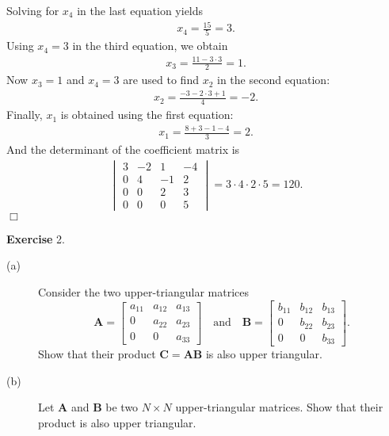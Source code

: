 \documentclass[UTF8,12pt,hyperref]{ctexart}
\makeatletter
\newenvironment{exercise}[1][{\color{blue}\bf Exercise}]%
{%
 \begin{center}   \begin{lrbox}{\@tempboxa}%
    \begin{minipage}{\textwidth}%
  {\color{blue}\bfseries
#1}   }{%
    \end{minipage}%
    \end{lrbox}
    \colorbox{green}{\noindent\usebox{\@tempboxa}} \end{center}  
}
\newenvironment{solve}[1][\color{blue}\bf Solve]{\begin{trivlist}
\item[\hskip \labelsep {\color{blue}\bfseries
#1}]}{\hfill$\Box$\end{trivlist}}
\makeatother
\begin{document}
\begin{solve}
    Solving for $x_4$ in the last equation yields
    \begin{align*}
      x_4=\frac{15}{5}=3.
    \end{align*}
    Using $x_4=3$ in the third equation, we obtain
    \begin{align*}
      x_3=\frac{11-3\cdot 3}{2} = 1.
    \end{align*}
    Now $x_3=1$ and $x_4=3$ are used to find $x_2$ in the second equation: 
    \begin{align*}
      x_2=\frac{-3-2\cdot 3+1}{4}=-2.
    \end{align*}
    Finally, $x_1$ is obtained using the first equation:
    \begin{align*}
      x_1=\frac{8+3-1-4}{3}=2.
    \end{align*}
    And the determinant of the coefficient matrix is
    \begin{align*}
      \begin{vmatrix}
        3& -2 & 1 &-4 \\
        0&  4&  -1& 2\\
        0&  0&  2& 3\\
        0&  0&  0& 5
      \end{vmatrix} = 3\cdot 4\cdot 2\cdot 5 = 120.
    \end{align*}
\end{solve}
 

\begin{exercise}2.\quad   
 \begin{description}
\item[(a)] Consider the two upper-triangular matrices
$$
\boldsymbol{A}=\left[\begin{array}{ccc}
a_{11}  & a_{12} & a_{13} \\
 0 &  a_{22} & a_{23} \\
 0 & 0 & a_{33}
\end{array}\right] \quad \mbox{and} \quad
\boldsymbol{B}=\left[\begin{array}{ccc}
b_{11}  & b_{12} & b_{13} \\
 0 &  b_{22} & b_{23} \\
 0 & 0 & b_{33}
\end{array}\right]. 
$$
Show that their product $\boldsymbol{C}=\boldsymbol{A}\boldsymbol{B}$ is also upper triangular.

\item[(b)] Let $\boldsymbol{A}$ and $\boldsymbol{B}$ be two $N \times N$ upper-triangular matrices. Show that their product is also upper triangular. 
\end{description}
\end{exercise}
  
\end{document}
